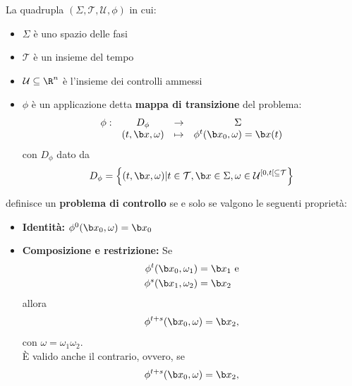 \begin{definition}
    La quadrupla $\left( \Sigma, \mathcal T, \mathcal U, \phi \right)$ in cui:
    \begin{itemize}
        \item $\Sigma$ è uno spazio delle fasi
        \item $\mathcal T$ è un insieme del tempo
        \item $\mathcal U \subseteq \R^n$ è l'insieme dei controlli ammessi
        \item $\phi$ è un applicazione detta \textbf{mappa di transizione} del problema:
            \begin{equation*}
                  \begin{array}{cccc}%
                      \phi: &D_\phi &\to &\Sigma \\
                      &(t, \b x, \omega) &\mapsto &\phi^t(\b x_0,\omega) = \b x(t)
                  \end{array}%
            \end{equation*}
            con $D_\phi$ dato da
            \begin{equation*}
                D_\phi = \left\{(t, \b x, \omega) | t \in \mathcal T, \b x \in \Sigma, \omega \in \mathcal U^{[0, t[ \subseteq \mathcal T} \right\}
            \end{equation*}
    \end{itemize}
    definisce un \textbf{problema di controllo} se e solo se valgono le seguenti proprietà:
    \begin{itemize}
        \item \textbf{Identità:}
            $\phi^0(\b x_0, \omega) = \b x_0$
        \item \textbf{Composizione e restrizione:}
            Se 
            \begin{align*}
            \phi^t(\b x_0, \omega_1) &= \b x_1 \text{ e}\\
            \phi^s(\b x_1, \omega_2) &= \b x_2
            \end{align*}
            allora
            \begin{equation*}
                \phi^{t+s}(\b x_0, \omega) = \b x_2,
            \end{equation*}
            con $\omega = \omega_1 \omega_2$.\\
            È valido anche il contrario, ovvero, se 
            \begin{equation*}
                \phi^{t+s}(\b x_0, \omega) = \b x_2,
            \end{equation*}

\end{itemize}
\end{definition}

